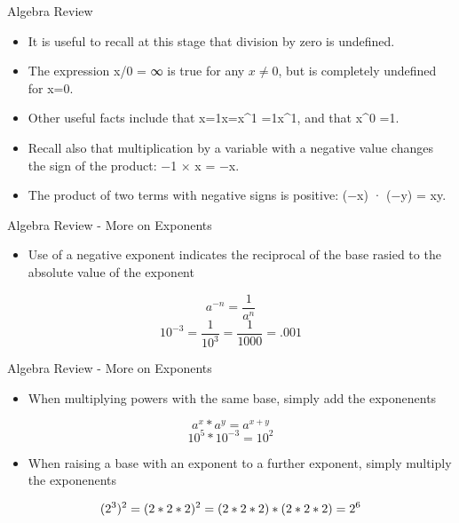 \documentclass[
  ignorenonframetext,
]{beamer}
\providecommand{\tightlist}{%
  \setlength{\itemsep}{0pt}\setlength{\parskip}{0pt}}
\begin{document}
\begin{frame}{Algebra Review}
\protect\hypertarget{algebra-review-2}{}

\begin{itemize}
\item
  It is useful to recall at this stage that division by zero is
  undefined.
\item
  The expression x/0 = ∞ is true for any \(x\neq 0\), but is completely
  undefined for x=0.
\item
  Other useful facts include that x=1x=x\^{}1 =1x\^{}1, and that x\^{}0
  =1.
\item
  Recall also that multiplication by a variable with a negative value
  changes the sign of the product: −1 × x = −x.
\item
  The product of two terms with negative signs is positive: (−x) · (−y)
  = xy.
\end{itemize}

\end{frame}

\begin{frame}{Algebra Review - More on Exponents}
\protect\hypertarget{algebra-review---more-on-exponents}{}

\begin{itemize}
\tightlist
\item
  Use of a negative exponent indicates the reciprocal of the base rasied
  to the absolute value of the exponent
\end{itemize}

\[ a^{-n} = \frac{1}{a^{n}}\]
\[ 10^{-3} = \frac{1}{10^{3}} = \frac{1}{1000} = .001\]

\end{frame}

\begin{frame}{Algebra Review - More on Exponents}
\protect\hypertarget{algebra-review---more-on-exponents-1}{}

\begin{itemize}
\tightlist
\item
  When multiplying powers with the same base, simply add the exponenents
\end{itemize}

\[a^{x} * a^{y}= a^{x+y}\] \[10^{5} * 10^{-3}= 10^{2}\]

\begin{itemize}
\tightlist
\item
  When raising a base with an exponent to a further exponent, simply
  multiply the exponenents
\end{itemize}

\[(2^{3})^{2}=(2*2*2)^{2} = \\  (2*2*2)*(2*2*2) =2^{6}\]

\end{frame}
\end{document}
